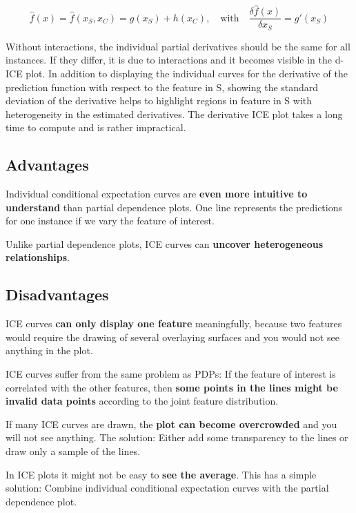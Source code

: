 \documentclass[
  10pt,
]{scrbook}
\begin{document}
\[\hat{f}(x)=\hat{f}(x_S,x_C)=g(x_S)+h(x_C),\quad\text{with}\quad\frac{\delta\hat{f}(x)}{\delta{}x_S}=g'(x_S)\]

Without interactions, the individual partial derivatives should be the same for all instances.
If they differ, it is due to interactions and it becomes visible in the d-ICE plot.
In addition to displaying the individual curves for the derivative of the prediction function with respect to the feature in S, showing the standard deviation of the derivative helps to highlight regions in feature in S with heterogeneity in the estimated derivatives.
The derivative ICE plot takes a long time to compute and is rather impractical.

\hypertarget{advantages-12}{%
\subsection{Advantages}\label{advantages-12}}

Individual conditional expectation curves are \textbf{even more intuitive to understand} than partial dependence plots.
One line represents the predictions for one instance if we vary the feature of interest.

Unlike partial dependence plots, ICE curves can \textbf{uncover heterogeneous relationships}.

\hypertarget{disadvantages-12}{%
\subsection{Disadvantages}\label{disadvantages-12}}

ICE curves \textbf{can only display one feature} meaningfully, because two features would require the drawing of several overlaying surfaces and you would not see anything in the plot.

ICE curves suffer from the same problem as PDPs:
If the feature of interest is correlated with the other features, then \textbf{some points in the lines might be invalid data points} according to the joint feature distribution.

If many ICE curves are drawn, the \textbf{plot can become overcrowded} and you will not see anything.
The solution: Either add some transparency to the lines or draw only a sample of the lines.

In ICE plots it might not be easy to \textbf{see the average}.
This has a simple solution:
Combine individual conditional expectation curves with the partial dependence plot.
\end{document}
